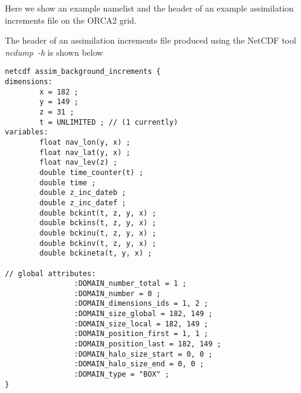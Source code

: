 \documentclass[NEMO_book]{subfiles}
\begin{document}
Here we show an example  namelist and the header of an example assimilation 
increments file on the ORCA2 grid.


The header of an assimilation increments file produced using the NetCDF tool
\mbox{\textit{ncdump~-h}} is shown below

\begin{alltt}
\tiny
\begin{verbatim}
netcdf assim_background_increments {
dimensions:
        x = 182 ;
        y = 149 ;
        z = 31 ;
        t = UNLIMITED ; // (1 currently)
variables:
        float nav_lon(y, x) ;
        float nav_lat(y, x) ;
        float nav_lev(z) ;
        double time_counter(t) ;
        double time ;
        double z_inc_dateb ;
        double z_inc_datef ;
        double bckint(t, z, y, x) ;
        double bckins(t, z, y, x) ;
        double bckinu(t, z, y, x) ;
        double bckinv(t, z, y, x) ;
        double bckineta(t, y, x) ;

// global attributes:
                :DOMAIN_number_total = 1 ;
                :DOMAIN_number = 0 ;
                :DOMAIN_dimensions_ids = 1, 2 ;
                :DOMAIN_size_global = 182, 149 ;
                :DOMAIN_size_local = 182, 149 ;
                :DOMAIN_position_first = 1, 1 ;
                :DOMAIN_position_last = 182, 149 ;
                :DOMAIN_halo_size_start = 0, 0 ;
                :DOMAIN_halo_size_end = 0, 0 ;
                :DOMAIN_type = "BOX" ;
}
\end{verbatim}
\end{alltt}
\end{document}
